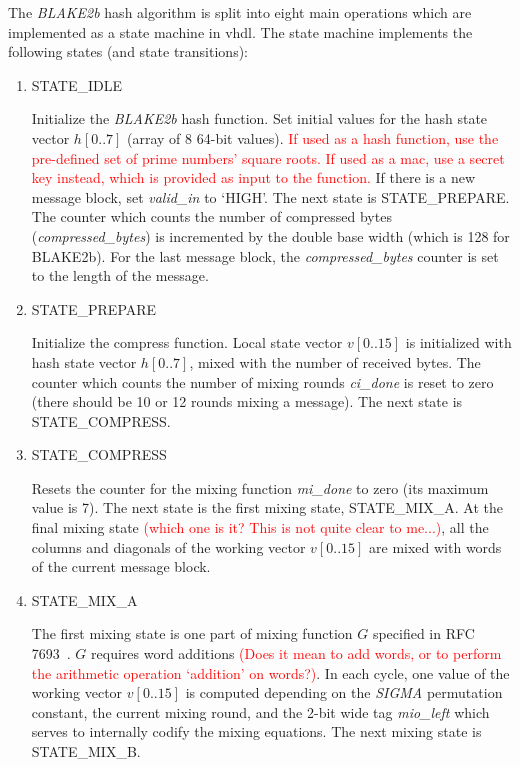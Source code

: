 \documentclass[%
	a4paper,
]
{article}
\newcommand{\todo}[1]{\textcolor{red}{#1}}
\begin{document}
The \emph{BLAKE2b} hash algorithm is split into eight main operations which
are implemented as a state machine in \gls{vhdl}. The state machine implements
the following states (and state transitions):

\begin{enumerate}

	\item STATE_IDLE

		Initialize the \emph{BLAKE2b} hash function. Set initial values for the
		hash state vector $h[0..7]$ (array of 8 64-bit values). \todo{If used as a
		hash function, use the pre-defined set of prime numbers' square roots.
		If used as a \gls{mac}, use a secret key instead, which is provided as
		input to the function.}
%
		If there is a new message block, set \emph{valid\_in} to
		`HIGH'. The next state is \mbox{STATE_PREPARE}. The counter which counts the
		number of compressed bytes (\emph{compressed\_bytes}) is incremented by
		the double base width (which is 128 for BLAKE2b). For the last message block,
		the \emph{compressed\_bytes} counter is set to the length of the message.

	\item STATE_PREPARE

		Initialize the compress function. Local state vector $v[0..15]$ is initialized
		with hash state vector $h[0..7]$, mixed with the number of received bytes.
		The counter which counts the number of mixing rounds \emph{ci_done} is reset
		to zero (there should be 10 or 12 rounds mixing a message). The next state is
		\mbox{STATE_COMPRESS}.

	\item STATE_COMPRESS

		Resets the counter for the mixing	function \emph{mi_done} to zero (its
		maximum	value is 7). The next state is the first mixing state,
		\mbox{STATE_MIX_A}. At the final mixing state \todo{(which one is it? This
		is not quite clear to me...)},
		all the columns and diagonals of the working vector $v[0..15]$ are
		mixed with words of the current message block.

	\item STATE_MIX_A

		The first mixing state is one part of mixing function $G$ specified in
		RFC 7693~\autocite[7]{rfc7693}. $G$ requires word additions \todo{(Does
		it mean to add words, or to perform the arithmetic operation `addition' on
		words?)}. In each cycle, one value of the working vector $v[0..15]$
		is computed depending on the \emph{SIGMA} permutation constant, the current
		mixing round, and the  2-bit wide tag \emph{mio_left} which serves
		to internally codify the mixing equations. The next mixing state is
		\mbox{STATE_MIX_B}.


\end{enumerate}
\end{document}
